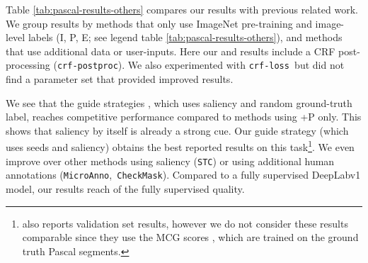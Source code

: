 \documentclass[british,10pt,twocolumn,letterpaper]{article}
\begin{document}
 \noindent Table \ref{tab:pascal-results-others} compares our results
 with previous related work. We group results by methods that only
 use ImageNet pre-training and image-level labels (I, P, E; see legend
 table \ref{tab:pascal-results-others}), and methods that use additional
 data or user-inputs. Here our  and 
 results include a CRF post-processing (\texttt{crf-postproc}). We
 also experimented with \texttt{crf-loss }but did not find a parameter
set that provided improved results.

We see that the guide strategies , which uses saliency
and random ground-truth label, reaches competitive performance compared
to methods using +P only. This shows that saliency by itself
is already a strong cue. Our guide strategy  (which
uses seeds and saliency) obtains the best reported results on this
task\footnote{\cite{Qi2016Eccv} also reports  validation set results, however
we do not consider these results comparable since they use the MCG
scores \cite{PontTuset2015ArxivMcg}, which are trained on the ground
truth Pascal segments.}. We even improve over other methods using saliency (\texttt{STC})
or using additional human annotations (\texttt{MicroAnno},\texttt{
CheckMask}). Compared to a fully supervised DeepLabv1 model, our results
reach  of the fully supervised quality. 
\end{document}
